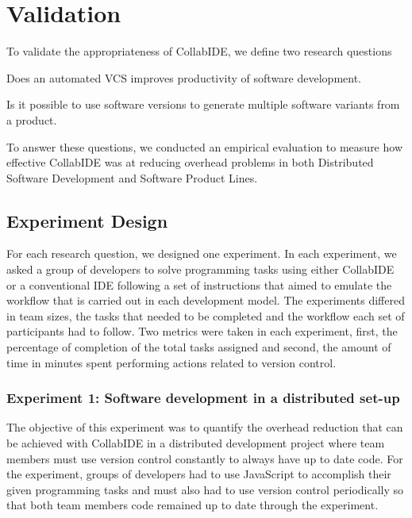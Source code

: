 

\section{Validation}
\label{sec:validation}

To validate the appropriateness of CollabIDE, we define two research questions
\begin{enumerate*}[label=(\arabic*)]
\item Does an automated \ac{VCS} improves productivity of software development.
\item Is it possible to use software versions to generate multiple software variants from a product.
\end{enumerate*} 
To answer these questions, we conducted an empirical evaluation 
to measure how effective CollabIDE was at reducing overhead problems 
in both Distributed Software Development and Software Product Lines.

\subsection{Experiment Design}


For each research question, we designed one experiment. In each experiment, we asked 
a group of developers to solve programming tasks using either CollabIDE or a 
conventional IDE following a set of instructions that aimed to emulate the workflow that is carried out in each development model. The experiments differed in team sizes, the tasks that needed to be completed and the workflow each set of participants had to follow. Two metrics were taken in each experiment, first, the percentage of completion of the total tasks assigned and second, the amount of time in minutes spent performing actions related to version control.

\subsubsection{Experiment 1: Software development in a distributed set-up}
The objective of this experiment was to quantify the overhead reduction that can be achieved with CollabIDE in a distributed development project where team members must use version control constantly to always have up to date code. 
For the experiment, groups of developers had to use JavaScript to accomplish their given programming tasks and must also had to use version control periodically so that both team members code remained up to date through the experiment. 


